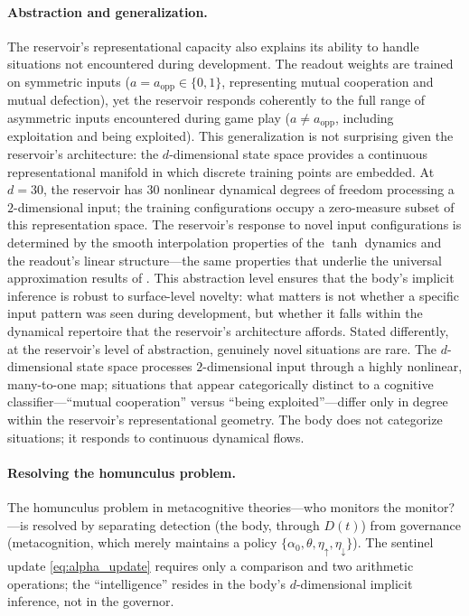 \documentclass[11pt,a4paper]{article}
\theoremstyle{definition}
\begin{document}
\paragraph{Abstraction and generalization.}
The reservoir's representational capacity also explains its ability to
handle situations not encountered during development.  The readout weights
are trained on symmetric inputs ($a = a_{\mathrm{opp}} \in \{0, 1\}$,
representing mutual cooperation and mutual defection), yet the reservoir
responds coherently to the full range of asymmetric inputs encountered
during game play ($a \neq a_{\mathrm{opp}}$, including exploitation and
being exploited).  This generalization is not surprising given the
reservoir's architecture: the $d$-dimensional state space provides a
continuous representational manifold in which discrete training points
are embedded.  At $d = 30$, the reservoir has $30$ nonlinear dynamical
degrees of freedom processing a $2$-dimensional input; the training
configurations occupy a zero-measure subset of this representation space.
The reservoir's response to novel input configurations is determined by
the smooth interpolation properties of the $\tanh$ dynamics and the
readout's linear structure---the same properties that underlie the
universal approximation results of \citet{grigoryeva2018}.
This abstraction level ensures that the body's implicit inference is robust
to surface-level novelty: what matters is not whether a specific input
pattern was seen during development, but whether it falls within the
dynamical repertoire that the reservoir's architecture affords.
Stated differently, at the reservoir's level of abstraction, genuinely
novel situations are rare.  The $d$-dimensional state space processes
$2$-dimensional input through a highly nonlinear, many-to-one map;
situations that appear categorically distinct to a cognitive
classifier---``mutual cooperation'' versus ``being exploited''---differ
only in degree within the reservoir's representational geometry.  The
body does not categorize situations; it responds to continuous dynamical
flows.

\paragraph{Resolving the homunculus problem.}
The homunculus problem in metacognitive theories---who monitors the
monitor?---is resolved by separating detection (the body, through $D(t)$)
from governance (metacognition, which merely maintains a policy
$\{\alpha_0, \theta, \eta_{\uparrow}, \eta_{\downarrow}\}$).
The sentinel update \eqref{eq:alpha_update} requires only a comparison
and two arithmetic operations; the ``intelligence'' resides in the body's
$d$-dimensional implicit inference, not in the governor.
\end{document}
